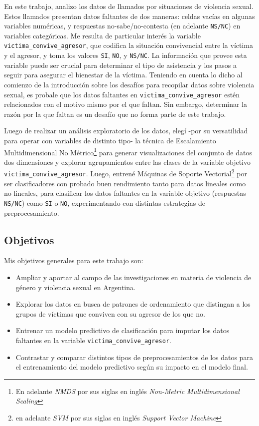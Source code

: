\documentclass[10 pt]{article}
\begin{document}
En este trabajo, analizo los datos de llamados por situaciones de violencia sexual. Estos llamados presentan datos faltantes de dos maneras: celdas vacías en algunas variables numéricas, y respuestas no-sabe/no-contesta (en adelante \texttt{NS/NC}) en variables categóricas. Me resulta de particular interés la variable \texttt{victima\_convive\_agresor}, que codifica la situación convivencial entre la víctima y el agresor, y toma los valores \texttt{SI}, \texttt{NO}, y \texttt{NS/NC}. La información que provee esta variable puede ser crucial para determinar el tipo de asistencia y los pasos a seguir para asegurar el bienestar de la víctima. Teniendo en cuenta lo dicho al comienzo de la introducción sobre los desafíos para recopilar datos sobre violencia sexual, es probale que los datos faltantes en \texttt{victima\_convive\_agresor} estén relacionados con el motivo mismo por el que faltan. Sin embargo, determinar la razón por la que faltan es un desafío que no forma parte de este trabajo. 

Luego de realizar un análisis exploratorio de los datos, elegí -por su versatilidad para operar con variables de distinto tipo- la técnica de Escalamiento Multidimensional No Métrico\footnote{En adelante \textit{NMDS} por sus siglas en inglés \textit{Non-Metric Multidimensional Scaling}} para generar visualizaciones del conjunto de datos dos dimensiones y explorar agrupamientos entre las clases de la variable objetivo \texttt{victima\_convive\_agresor}. Luego, entrené Máquinas de Soporte Vectorial\footnote{en adelante \textit{SVM} por sus siglas en inglés \textit{Support Vector Machine}} por ser clasificadores con probado buen rendimiento tanto para datos lineales como no lineales, para clasificar los datos faltantes en la variable objetivo (respuestas \texttt{NS/NC}) como \texttt{SI} o \texttt{NO}, experimentando con distintas estrategias de preprocesamiento. 


\subsection{Objetivos}

Mis objetivos generales para este trabajo son:

\begin{itemize}
    \item Ampliar y aportar al campo de las investigaciones en materia de violencia de género y violencia sexual en Argentina.
    \item Explorar los datos en busca de patrones de ordenamiento que distingan a los grupos de víctimas que conviven con su agresor de los que no.
    \item Entrenar un modelo predictivo de clasificación para imputar los datos faltantes en la variable \texttt{victima\_convive\_agresor}. 
    \item Contrastar y comparar distintos tipos de preprocesamientos de los datos para el entrenamiento del modelo predictivo según su impacto en el modelo final. 

\end{itemize}
\end{document}
